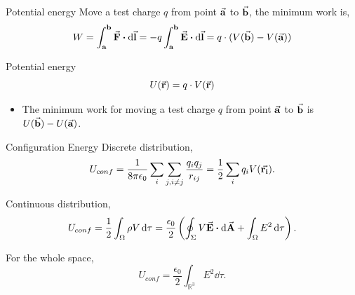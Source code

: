 \documentclass{beamer}
\begin{document}
\begin{frame}{Potential energy}
    Move a test charge $q$ from point $\va{a}$ to $\va{b}$, the minimum work is,
    \begin{equation}
        W = \int_{\vb{a}}^{\vb{b}} \va{F} \vdot \dd{\va{l}} = -q \int_{\vb{a}}^{\vb{b}} \va{E} \vdot \dd{\va{l}} = q \cdot (V(\va{b}) - V(\va{a}))
    \end{equation}

    \begin{block}{Potential energy}
        \begin{equation}
            U(\va{r}) = q \cdot V(\va{r})
        \end{equation}
    \end{block}

    \begin{itemize}
        \item The minimum work for moving a test charge $q$ from point $\va{a}$ to $\va{b}$ is $U(\va{b}) - U(\va{a})$.
    \end{itemize}
\end{frame}


\begin{frame}{Configuration Energy}
    Discrete distribution,
    \begin{equation}
        U_{conf} = \frac{1}{8 \pi \epsilon_0} \sum_{i} \sum_{j, i \neq j} \frac{q_i q_j}{r_{ij}} = \frac{1}{2} \sum_{i} q_i V(\va{r_i}).
    \end{equation}

    Continuous distribution,
    \begin{equation}
        U_{conf} = \frac{1}{2} \int_{\Omega} \rho V \dd{\tau} = \frac{\epsilon_0}{2} \left( \oint_{\Sigma} V \va{E} \vdot \dd{\va{A}} + \int_{\Omega} E^2 \dd{\tau} \right).
    \end{equation}

    For the whole space,
    \begin{equation}
        U_{conf} = \frac{\epsilon_0}{2} \int_{\mathbb{R}^3} E^2 \dd{\tau}.
    \end{equation}
\end{frame}
\end{document}
